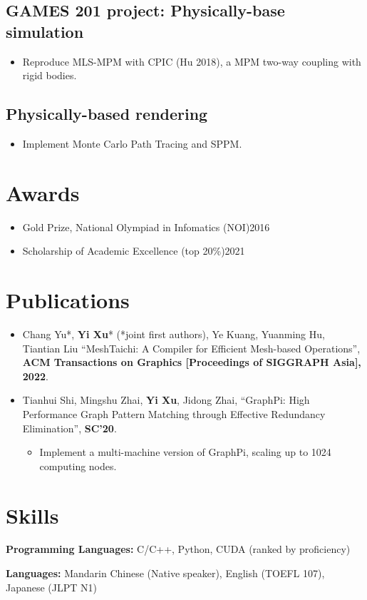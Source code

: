 \documentclass{resume}
\begin{document}
\subsection{\textbf{GAMES 201 project: Physically-base simulation}}
\begin{itemize}
  \item Reproduce MLS-MPM with CPIC (Hu 2018), a MPM two-way coupling with rigid bodies.
\end{itemize}

\subsection{\textbf{Physically-based rendering}}
\begin{itemize}
  \item Implement Monte Carlo Path Tracing and SPPM.
\end{itemize}

\section{Awards}
\begin{itemize}
  \item Gold Prize, National Olympiad in Infomatics (NOI)\hfill 2016
  \item Scholarship of Academic Excellence (top 20\%)\hfill 2021
\end{itemize}

\section{Publications}
\begin{itemize}
  \item Chang Yu*, \textbf{Yi Xu}* (*joint first authors), Ye Kuang, Yuanming Hu, Tiantian Liu   
  ``MeshTaichi: A Compiler for Efficient Mesh-based Operations'', 
  \textbf{ACM Transactions on Graphics [Proceedings of SIGGRAPH Asia], 2022}.

	
  \item Tianhui Shi, Mingshu Zhai, \textbf{Yi Xu}, Jidong Zhai, 
  ``GraphPi: High Performance Graph Pattern Matching through Effective Redundancy Elimination'', 
  \textbf{SC'20}.
  \begin{itemize}
	\item Implement a multi-machine version of GraphPi, scaling up to 1024 computing nodes.
  \end{itemize}
\end{itemize}

\section{Skills}
\textbf{Programming Languages:} \small C/C++, Python, CUDA (ranked by proficiency)

\textbf{Languages:} \small Mandarin Chinese (Native speaker), English (TOEFL 107), Japanese (JLPT N1)

%
%
\end{document}
